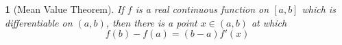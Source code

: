 \documentclass[11pt]{article}
\numberwithin{equation}{section}
\newcommand{\navy}[1]{\textcolor{MidnightBlue}{\bf #1}}
\theoremstyle{plain}
\newtheorem{theorem}{\color{ForestGreen}{\textbf{Theorem}}}[section]
\theoremstyle{definition}
\newtheorem{definition}{\color{MidnightBlue}{\textbf{Definition}}}[section]
\newcommand\norm[1]{\lVert#1\rVert}
\newcommand{\1}{\mathbbm 1}
\def\d{\delta}
\newcommand{\p}{\varphi}
\newcommand{\e}{\varepsilon}
\begin{document}
\begin{theorem}[Mean Value Theorem]
	If $f$ is a real continuous function on $[a,b]$ which is differentiable on $(a,b)$, then there is a point $x \in (a,b)$ at which 
	\begin{equation}
		f(b) - f(a) = (b - a) f'(x)
	\end{equation}
\end{theorem}







\end{document}
